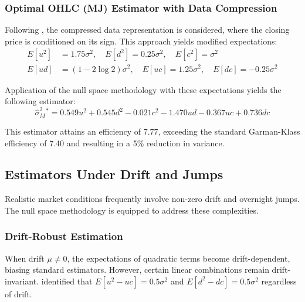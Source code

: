 \subsubsection{Optimal OHLC (MJ) Estimator with Data Compression}

Following \citet{meilijson2009GarmanKlassVolatilityEstimator}, the compressed data representation is considered, where the closing price is conditioned on its sign. This approach yields modified expectations:
\begin{align}
E[u^2] &= 1.75\sigma^2, \quad E[d^2] = 0.25\sigma^2, \quad E[c^2] = \sigma^2 \\
E[ud] &= (1 - 2\log 2)\sigma^2, \quad E[uc] = 1.25\sigma^2, \quad E[dc] = -0.25\sigma^2
\end{align}

Application of the null space methodology with these expectations yields the following estimator:
\begin{equation}
\hat{\sigma}^2_{M}^* = 0.549u^2 + 0.545d^2 - 0.021c^2 - 1.470ud - 0.367uc + 0.736dc
\end{equation}

This estimator attains an efficiency of 7.77, exceeding the standard Garman-Klass efficiency of 7.40 and resulting in a 5\% reduction in variance.

\subsection{Estimators Under Drift and Jumps}

Realistic market conditions frequently involve non-zero drift and overnight jumps. The null space methodology is equipped to address these complexities.

\subsubsection{Drift-Robust Estimation}

When drift $\mu \neq 0$, the expectations of quadratic terms become drift-dependent, biasing standard estimators. However, certain linear combinations remain drift-invariant. \citet{rogers1991EstimatingVarianceHigh} identified that $E[u^2 - uc] = 0.5\sigma^2$ and $E[d^2 - dc] = 0.5\sigma^2$ regardless of drift.

